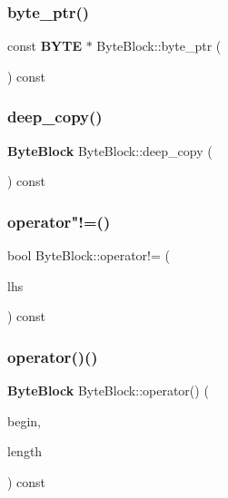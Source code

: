 \mbox{\label{class_byte_block_ad1cca46563041dfa94469213e71eeab6}} 
\subsubsection{byte\+\_\+ptr()\hspace{0.1cm}{\footnotesize\ttfamily [2/2]}}
{\footnotesize\ttfamily const \textbf{ B\+Y\+TE} $\ast$ Byte\+Block\+::byte\+\_\+ptr (\begin{DoxyParamCaption}{ }\end{DoxyParamCaption}) const}

\mbox{\label{class_byte_block_a67954bc5c1f34b2ab865bacb777c9f37}} 
\subsubsection{deep\+\_\+copy()}
{\footnotesize\ttfamily \textbf{ Byte\+Block} Byte\+Block\+::deep\+\_\+copy (\begin{DoxyParamCaption}{ }\end{DoxyParamCaption}) const}

\mbox{\label{class_byte_block_a083e6c9d3ec3e39d79953eb48551d0cf}} 
\subsubsection{operator"!=()}
{\footnotesize\ttfamily bool Byte\+Block\+::operator!= (\begin{DoxyParamCaption}\item[{const \textbf{ Byte\+Block} \&}]{lhs }\end{DoxyParamCaption}) const}

\mbox{\label{class_byte_block_ad60eb576a039f436736d35e3a6d09131}} 
\subsubsection{operator()()}
{\footnotesize\ttfamily \textbf{ Byte\+Block} Byte\+Block\+::operator() (\begin{DoxyParamCaption}\item[{size\+\_\+t}]{begin,  }\item[{size\+\_\+t}]{length }\end{DoxyParamCaption}) const}

